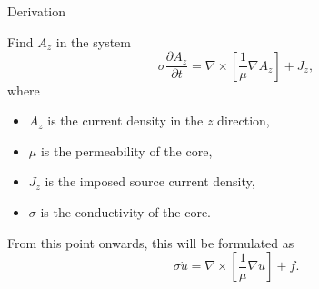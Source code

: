 \begin{frame}[fragile]{Derivation} %
    \begin{problemdef}
        Find $A_z$ in the system
        \begin{equation}
            \sigma\frac{\partial A_z}{\partial t} = \nabla \times \left[\frac{1}{\mu}\nabla A_z\right] + J_z,
        \end{equation}
        where
        \begin{itemize}
            \item $A_z$ is the current density in the $z$ direction,
            \item $\mu$ is the permeability of the core,
            \item $J_z$ is the imposed source current density,
            \item $\sigma$ is the conductivity of the core.
        \end{itemize}
        From this point onwards, this will be formulated as
        \begin{equation}
            \sigma\dot u = \nabla \times \left[\frac{1}{\mu}\nabla u\right] + f.
        \end{equation}
    \end{problemdef}
\end{frame}
